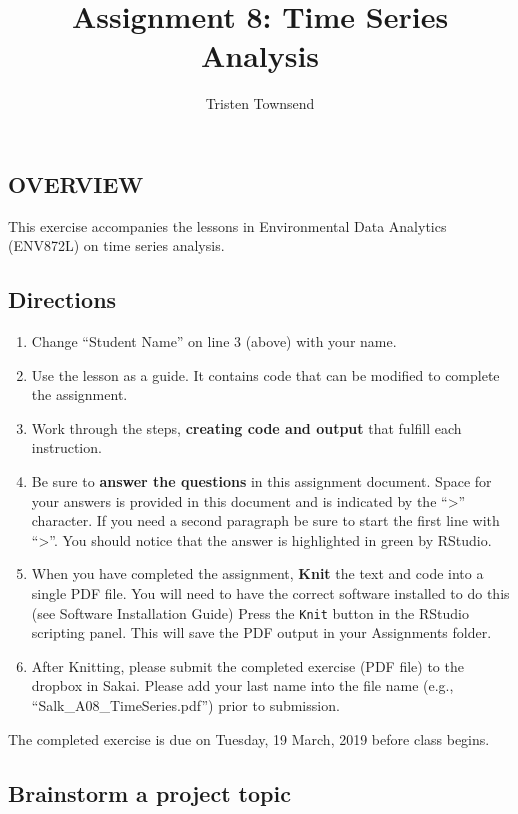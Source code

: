 \documentclass[]{article}
\title{Assignment 8: Time Series Analysis}
\author{Tristen Townsend}
\date{}
\providecommand{\tightlist}{%
  \setlength{\itemsep}{0pt}\setlength{\parskip}{0pt}}
\begin{document}
\maketitle

\subsection{OVERVIEW}\label{overview}

This exercise accompanies the lessons in Environmental Data Analytics
(ENV872L) on time series analysis.

\subsection{Directions}\label{directions}

\begin{enumerate}
\def\labelenumi{\arabic{enumi}.}
\tightlist
\item
  Change ``Student Name'' on line 3 (above) with your name.
\item
  Use the lesson as a guide. It contains code that can be modified to
  complete the assignment.
\item
  Work through the steps, \textbf{creating code and output} that fulfill
  each instruction.
\item
  Be sure to \textbf{answer the questions} in this assignment document.
  Space for your answers is provided in this document and is indicated
  by the ``\textgreater{}'' character. If you need a second paragraph be
  sure to start the first line with ``\textgreater{}''. You should
  notice that the answer is highlighted in green by RStudio.
\item
  When you have completed the assignment, \textbf{Knit} the text and
  code into a single PDF file. You will need to have the correct
  software installed to do this (see Software Installation Guide) Press
  the \texttt{Knit} button in the RStudio scripting panel. This will
  save the PDF output in your Assignments folder.
\item
  After Knitting, please submit the completed exercise (PDF file) to the
  dropbox in Sakai. Please add your last name into the file name (e.g.,
  ``Salk\_A08\_TimeSeries.pdf'') prior to submission.
\end{enumerate}

The completed exercise is due on Tuesday, 19 March, 2019 before class
begins.

\subsection{Brainstorm a project
topic}\label{brainstorm-a-project-topic}
\end{document}
